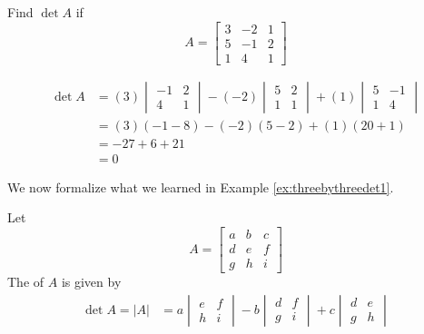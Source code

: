 \documentclass{ximera}
\begin{document}
\begin{example}\label{ex:threebythreedet1}
Find $\det{A}$ if 
$$A=\begin{bmatrix}3&-2&1\\5&-1&2\\1&4&1\end{bmatrix}$$
\begin{explanation}
\begin{align*}
\det{A}&=(3)\begin{vmatrix}-1&2\\4&1\end{vmatrix}-(-2)\begin{vmatrix}5&2\\1&1\end{vmatrix}+(1)\begin{vmatrix}5&-1\\1&4\end{vmatrix}\\
&=(3)(-1-8)-(-2)(5-2)+(1)(20+1)\\
&=-27+6+21\\
&=0
\end{align*}

\end{explanation}
\end{example}

We now formalize what we learned in Example \ref{ex:threebythreedet1}.

\begin{definition}\label{def:threebythreedet}
Let
$$A=\begin{bmatrix}a&b&c\\d&e&f\\g&h&i\end{bmatrix}$$
The  of $A$ is given by
\begin{align}\label{eq:det3by3}
\det{A}=|A|&=a\begin{vmatrix}e&f\\h&i\end{vmatrix}-b\begin{vmatrix}d&f\\g&i\end{vmatrix}+c\begin{vmatrix}d&e\\g&h\end{vmatrix}
\end{align}
\end{definition}
\end{document}
